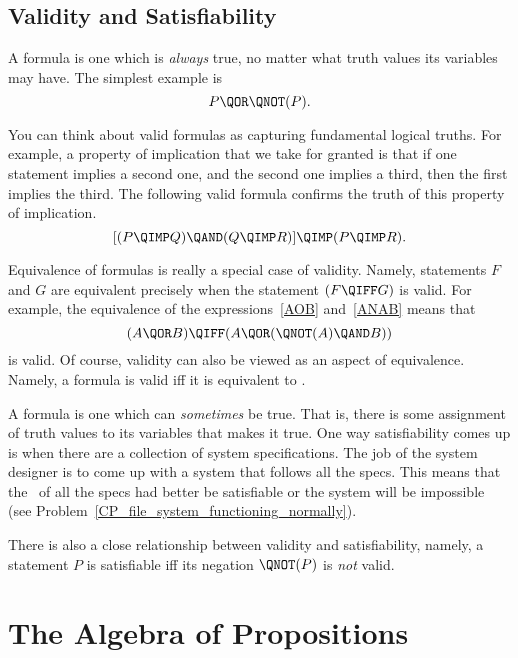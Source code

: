 \subsection{Validity and Satisfiability}
A  formula is one which is \emph{always} true, no matter
what truth values its variables may have.  The simplest example is
\[
P \QOR \QNOT(P).
\]

You can think about valid formulas as capturing fundamental logical
truths.  For example, a property of implication that we take for
granted is that if one statement implies a second one, and the second
one implies a third, then the first implies the third.  The following
valid formula confirms the truth of this property of implication.
\[
[(P \QIMP Q) \QAND (Q \QIMP R)] \QIMP (P \QIMP R).
\]

Equivalence of formulas is really a special case of validity.  Namely,
statements $F$ and $G$ are equivalent precisely when the statement $(F
\QIFF G)$ is valid.  For example, the equivalence of the
expressions~\eqref{AOB} and~\eqref{ANAB} means that
\[
(A \QOR B) \QIFF (A \QOR (\QNOT(A) \QAND B))
\]
is valid.  Of course, validity can also be viewed as an aspect of
equivalence.  Namely, a formula is valid iff it is equivalent
to \true.

A  formula is one which can \emph{sometimes} be
true.  That is, there is some assignment of truth values to its
variables that makes it true.  One way satisfiability comes up is when
there are a collection of system specifications.  The job of the
system designer is to come up with a system that follows all the
specs.  This means that the \QAND\ of all the specs had better be
satisfiable or the system will be impossible (see
Problem~\ref{CP_file_system_functioning_normally}).

There is also a close relationship between validity and
satisfiability, namely, a statement $P$ is satisfiable iff its
negation $\QNOT(P)$ is \emph{not} valid.

\begin{problems}
\practiceproblems
{}

\classproblems
{}
\end{problems}


\section{The Algebra of Propositions}

